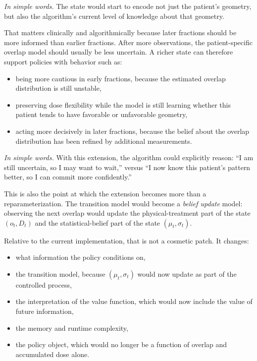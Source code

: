 \documentclass[11pt]{article}
\begin{document}
\noindent\textit{In simple words.} The state would start to encode not just the patient's geometry, but also the algorithm's current level of knowledge about that geometry.

That matters clinically and algorithmically because later fractions should be more informed than earlier fractions. After more observations, the patient-specific overlap model should usually be less uncertain. A richer state can therefore support policies with behavior such as:
\begin{itemize}
\item being more cautious in early fractions, because the estimated overlap distribution is still unstable,
\item preserving dose flexibility while the model is still learning whether this patient tends to have favorable or unfavorable geometry,
\item acting more decisively in later fractions, because the belief about the overlap distribution has been refined by additional measurements.
\end{itemize}

\noindent\textit{In simple words.} With this extension, the algorithm could explicitly reason: ``I am still uncertain, so I may want to wait,'' versus ``I now know this patient's pattern better, so I can commit more confidently.''

This is also the point at which the extension becomes more than a reparameterization. The transition model would become a \emph{belief update} model: observing the next overlap would update the physical-treatment part of the state $(o_t,D_t)$ and the statistical-belief part of the state $(\mu_t,\sigma_t)$.

Relative to the current implementation, that is not a cosmetic patch. It changes:
\begin{itemize}
\item what information the policy conditions on,
\item the transition model, because $(\mu_t,\sigma_t)$ would now update as part of the controlled process,
\item the interpretation of the value function, which would now include the value of future information,
\item the memory and runtime complexity,
\item the policy object, which would no longer be a function of overlap and accumulated dose alone.
\end{itemize}
\end{document}
